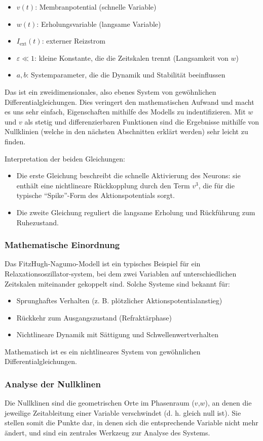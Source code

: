 \begin{itemize}
	\item $v(t)$: Membranpotential (schnelle Variable)
	\item $w(t)$: Erholungsvariable (langsame Variable)
	\item $I_{\text{ext}}(t)$: externer Reizstrom
	\item $\varepsilon \ll 1$: kleine Konstante, die die Zeitskalen trennt (Langsamkeit von $w$)
	\item $a, b$: Systemparameter, die die Dynamik und Stabilität beeinflussen
\end{itemize}
Das ist ein zweidimensionales, also ebenes System von gewöhnlichen Differentialgleichungen. Dies veringert den mathematischen Aufwand und macht es uns sehr einfach, Eigenschaften mithilfe des Modells zu indentifizieren.
Mit $w$ und $v$ als stetig und differenzierbaren Funktionen sind die Ergebnisse mithilfe von Nullklinien (welche in den nächsten Abschnitten erklärt werden) sehr leicht zu finden.

Interpretation der beiden Gleichungen:
\begin{itemize}
    \item Die erste Gleichung beschreibt die schnelle Aktivierung des Neurons: sie enthält eine nichtlineare Rückkopplung durch den Term $v^3$, die für die typische ``Spike''-Form des Aktionspotentials sorgt.
    \item Die zweite Gleichung reguliert die langsame Erholung und Rückführung zum Ruhezustand.
\end{itemize}
\subsubsection{Mathematische Einordnung}
Das FitzHugh-Nagumo-Modell ist ein typisches Beispiel für ein Relaxationsoszillator-system, bei dem zwei Variablen auf unterschiedlichen Zeitskalen miteinander gekoppelt sind. Solche Systeme sind bekannt für:
%
\begin{itemize}
	\item Sprunghaftes Verhalten (z. B. plötzlicher Aktionspotentialanstieg)
	\item Rückkehr zum Ausgangszustand (Refraktärphase)
	\item Nichtlineare Dynamik mit Sättigung und Schwellenwertverhalten
\end{itemize}
Mathematisch ist es ein nichtlineares System von gewöhnlichen Differentialgleichungen.
\subsubsection{Analyse der Nullklinen}
Die Nullklinen sind die geometrischen Orte im Phasenraum ($v$,$w$),
an denen die jeweilige Zeitableitung einer Variable verschwindet
(d. h. gleich null ist).
Sie stellen somit die Punkte dar, in denen sich die entsprechende
Variable nicht mehr ändert, und sind ein zentrales Werkzeug zur
Analyse des Systems.
%


